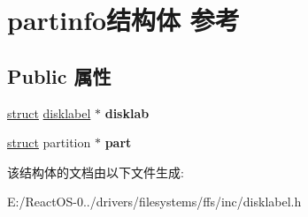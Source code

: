 \hypertarget{structpartinfo}{}\section{partinfo结构体 参考}
\label{structpartinfo}
\subsection*{Public 属性}
\begin{DoxyCompactItemize}
\item 
\mbox{\label{structpartinfo_a7996b39026d72a89061f1c29abde4af2}} 
\hyperlink{interfacestruct}{struct} \hyperlink{structdisklabel}{disklabel} $\ast$ {\bfseries disklab}
\item 
\mbox{\label{structpartinfo_a1d625384839bbf899745f5fba00f3d14}} 
\hyperlink{interfacestruct}{struct} partition $\ast$ {\bfseries part}
\end{DoxyCompactItemize}


该结构体的文档由以下文件生成\+:\begin{DoxyCompactItemize}
\item 
E\+:/\+React\+O\+S-\/0../drivers/filesystems/ffs/inc/disklabel.\+h\end{DoxyCompactItemize}
